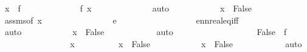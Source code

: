 \begin{isabellebody}
\ {\isachardoublequoteopen}x\ {\isasymin}\ f\ {\isacharminus}{\kern0pt}{\isacharbackquote}{\kern0pt}\ {\isacharbraceleft}{\kern0pt}{}{\isacharbraceright}{\kern0pt}{\isachardoublequoteclose}\isanewline
\ \ \ \ \ \ \ \ \isamarkupfalse%
\ \isamarkupfalse%
\ {\isachardoublequoteopen}f\ x\ {\isacharequal}{\kern0pt}\ {}{\isachardoublequoteclose}\isanewline
\ \ \ \ \ \ \ \ \ \ \isamarkupfalse%
\ auto\isanewline
\ \ \ \ \ \ \ \ \isamarkupfalse%
\ \isamarkupfalse%
\ {\isachardoublequoteopen}x\ {\isacharequal}{\kern0pt}\ False{\isachardoublequoteclose}\isanewline
\ \ \ \ \ \ \ \ \ \ \isamarkupfalse%
\ assms{\isacharparenleft}{\kern0pt}{}{\isacharparenright}{\kern0pt}{\isacharbrackleft}{\kern0pt}of\ x{\isacharbrackright}{\kern0pt}\ \isanewline
\ \ \ \ \ \ \ \ \ \ \ \ \ \ \ {\isacartoucheopen}e\ {\isachargreater}{\kern0pt}\ {}{\isacartoucheclose}\isanewline
\ \ \ \ \ \ \ \ \ \ \ \ \ \ \ \ ennreal{\isacharunderscore}{\kern0pt}eq{\isacharunderscore}{\kern0pt}{}{\isacharunderscore}{\kern0pt}iff\isanewline
\ \ \ \ \ \ \ \ \ \ \isamarkupfalse%
\ auto\isanewline
\ \ \ \ \ \ \ \ \isamarkupfalse%
\ \isamarkupfalse%
\ {\isachardoublequoteopen}x\ {\isasymin}\ {\isacharbraceleft}{\kern0pt}False{\isacharbraceright}{\kern0pt}{\isachardoublequoteclose}\isanewline
\ \ \ \ \ \ \ \ \ \ \isamarkupfalse%
\ auto\isanewline
\ \ \ \ \ \ \isamarkupfalse%
\isanewline
\ \ \ \ \isamarkupfalse%
\isanewline
\ \ \ \ \ \ \isamarkupfalse%
\ {\isachardoublequoteopen}{\isacharbraceleft}{\kern0pt}False{\isacharbraceright}{\kern0pt}\ {\isasymsubseteq}\ f\ {\isacharminus}{\kern0pt}{\isacharbackquote}{\kern0pt}\ {\isacharbraceleft}{\kern0pt}{}{\isacharbraceright}{\kern0pt}{\isachardoublequoteclose}\isanewline
\ \ \ \ \ \ \isamarkupfalse%
\isanewline
\ \ \ \ \ \ \ \ \isamarkupfalse%
\ x\isanewline
\ \ \ \ \ \ \ \ \isamarkupfalse%
\ {\isachardoublequoteopen}x\ {\isasymin}\ {\isacharbraceleft}{\kern0pt}False{\isacharbraceright}{\kern0pt}{\isachardoublequoteclose}\isanewline
\ \ \ \ \ \ \ \ \isamarkupfalse%
\ \isamarkupfalse%
\ {\isachardoublequoteopen}x\ {\isacharequal}{\kern0pt}\ False{\isachardoublequoteclose}\isanewline
\ \ \ \ \ \ \ \ \ \ \isamarkupfalse%
\ auto\isanewline
\ \ \ \ \ \ \ \ \isamarkupfalse%

\end{isabellebody}
